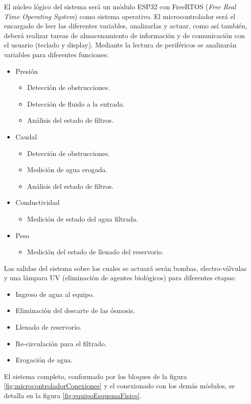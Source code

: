 \documentclass[
11pt, %
]{charter}
\begin{document}
El núcleo lógico del sistema será un módulo ESP32 con FreeRTOS (\textit{Free Real Time Operating System}) como sistema operativo. El microcontrolador será el encargado de leer las diferentes variables, analizarlas y actuar, como así también, deberá realizar tareas de almacenamiento de información y de comunicación con el usuario (teclado y display).
Mediante la lectura de periféricos se analizarán variables para diferentes funciones:
\begin{itemize}
	\item Presión
	\begin{itemize}
		\item Detección de obstrucciones.
		\item Detección de fluido a la entrada.
		\item Análisis del estado de filtros.
	\end{itemize}
	\item Caudal	
	\begin{itemize}
		\item Detección de obstrucciones.
		\item Medición de agua erogada.
		\item Análisis del estado de filtros.
	\end{itemize}
	\item Conductividad
	\begin{itemize}
		\item Medición de estado del agua filtrada.
	\end{itemize}
	\item Peso
	\begin{itemize}
		\item Medición del estado de llenado del reservorio.
	\end{itemize}
\end{itemize}

Las salidas del sistema sobre los cuales se actuará serán bombas, electro-válvulas y una lámpara UV (eliminación de agentes biológicos) para diferentes etapas:
\begin{itemize}
	\item Ingreso de agua al equipo.
	\item Eliminación del descarte de las ósmosis.
	\item Llenado de reservorio.
	\item Re-circulación para el filtrado.
	\item Erogación de agua.
\end{itemize}

El sistema completo, conformado por los bloques de la figura \ref{fig:microcontroladorConexiones} y el conexionado con los demás módulos, se detalla en la figura \ref{fig:equipoEsquemaFisico}.
\end{document}
